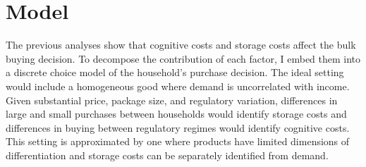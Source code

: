 \documentclass[AER]{AEA_mal}
\begin{document}
%
%
%
%   
%

\section{Model}
\label{model}

The previous analyses show that cognitive costs and storage costs affect the bulk buying decision. To decompose the contribution of each factor, I embed them into a discrete choice model of the household's purchase decision. The ideal setting would include a homogeneous good where demand is uncorrelated with income. Given substantial price, package size, and regulatory variation, differences in large and small purchases between households would identify storage costs and differences in buying between regulatory regimes would identify cognitive costs. This setting is approximated by one where products have limited dimensions of differentiation and storage costs can be separately identified from demand.
\end{document}
